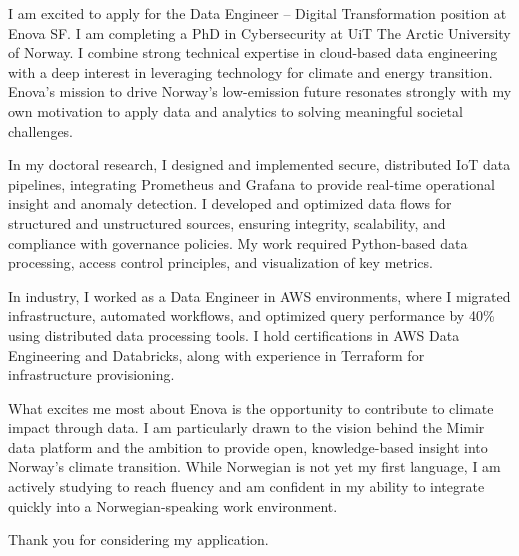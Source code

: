 I am excited to apply for the Data Engineer – Digital Transformation position at Enova SF. I am completing a PhD in Cybersecurity at UiT The Arctic University of Norway. I combine strong technical expertise in cloud-based data engineering with a deep interest in leveraging technology for climate and energy transition. Enova’s mission to drive Norway’s low-emission future resonates strongly with my own motivation to apply data and analytics to solving meaningful societal challenges.

In my doctoral research, I designed and implemented secure, distributed IoT data pipelines, integrating Prometheus and Grafana to provide real-time operational insight and anomaly detection. I developed and optimized data flows for structured and unstructured sources, ensuring integrity, scalability, and compliance with governance policies. My work required Python-based data processing, access control principles, and visualization of key metrics.

In industry, I worked as a Data Engineer in AWS environments, where I migrated infrastructure, automated workflows, and optimized query performance by 40\% using distributed data processing tools. I hold certifications in AWS Data Engineering and Databricks, along with experience in Terraform for infrastructure provisioning.

What excites me most about Enova is the opportunity to contribute to climate impact through data. I am particularly drawn to the vision behind the Mimir data platform and the ambition to provide open, knowledge-based insight into Norway’s climate transition. While Norwegian is not yet my first language, I am actively studying to reach fluency and am confident in my ability to integrate quickly into a Norwegian-speaking work environment.

Thank you for considering my application.